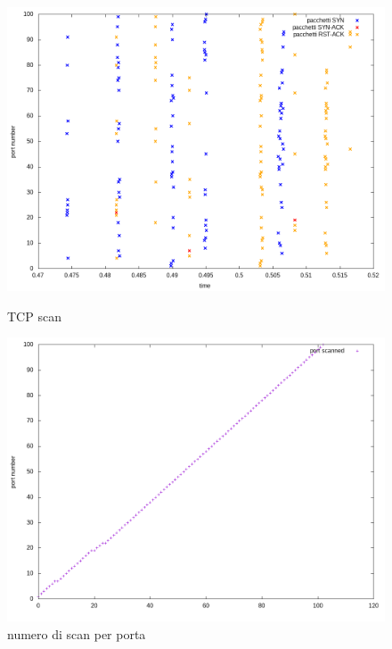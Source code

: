 \documentclass{article}
\begin{document}
\begin{figure}%
  \begin{minipage}{0.49\textwidth}
    \centering
    \includegraphics[width=1\linewidth]{vm_tcp_completo.png}
    \vspace{-5pt}
    \caption{TCP scan}\label{Fig:tcp1}
  \end{minipage}%
  \begin{minipage}{0.49\textwidth}
    \centering
    \includegraphics[width=1\linewidth]{vm_tcp_num_test.png}
    \vspace{-5pt}
    \caption{numero di scan per porta}\label{Fig:num}
  \end{minipage}
\end{figure}
\end{document}
